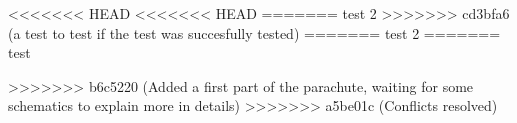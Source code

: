 <<<<<<< HEAD
<<<<<<< HEAD
=======
test 2
>>>>>>> cd3bfa6 (a test to test if the test was succesfully tested)
=======
test 2
=======
test


>>>>>>> b6c5220 (Added a first part of the parachute, waiting for some schematics to explain more in details)
>>>>>>> a5be01c (Conflicts resolved)
